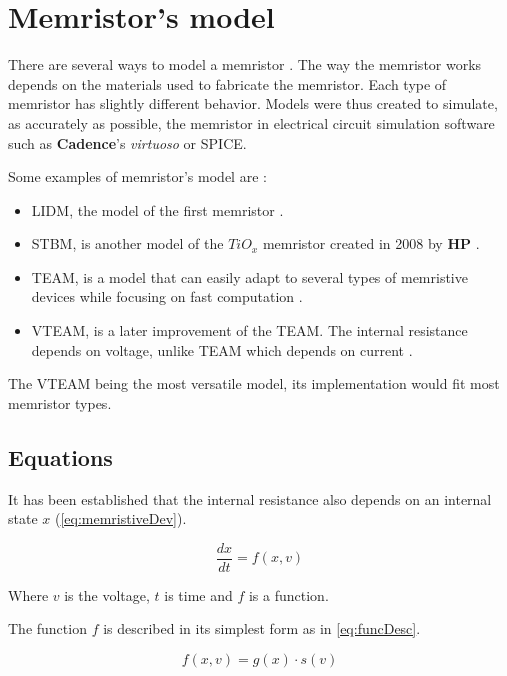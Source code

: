 \section{Memristor's model}\label{sec:model}

There are several ways to model a memristor \cite{memristorFab,memTEAMmodel, memVTEAMmodel, memristorSpiceModels}. The way the memristor works depends on the materials used to fabricate the memristor. Each type of memristor has slightly different behavior. Models were thus created to simulate, as accurately as possible, the memristor in electrical circuit simulation software such as \textbf{Cadence}'s \textit{virtuoso} or SPICE.

Some examples of memristor's model are :

\begin{itemize}
  \item \acf{LIDM}, the model of the first memristor \cite{memristorFab}.
  \item \acf{STBM}, is another model of the $TiO_x$ memristor created in 2008 by \textbf{HP} \cite{memristorFab, memristorSpiceModels}.
  \item \acf{TEAM}, is a model that can easily adapt to several types of memristive devices while focusing on fast computation \cite{memTEAMmodel}.
  \item \acf{VTEAM}, is a later improvement of the \ac{TEAM}. The internal resistance depends on voltage, unlike \ac{TEAM} which depends on current \cite{memVTEAMmodel}.
\end{itemize}

The \ac{VTEAM} being the most versatile model, its implementation would fit most memristor types.

\subsection{Equations}

It has been established that the internal resistance also depends on an internal state $x$ (\cref{eq:memristiveDev}).

\begin{equation}
  \frac{dx}{dt}=f(x,v)
\end{equation}

Where $v$ is the voltage, $t$ is time and $f$ is a function.

The function $f$ is described in its simplest form as in \cref{eq:funcDesc}.

\begin{equation}\label{eq:funcDesc}
  f(x,v)=g(x)\cdot s(v)
\end{equation}

